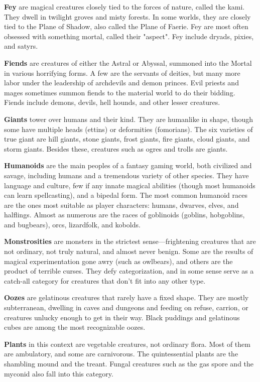 \textbf*{Fey} are magical creatures closely tied to the forces of nature, called the kami. They dwell in twilight groves and misty forests. In some worlds, they are closely tied to the Plane of Shadow, also called the Plane of Faerie. Fey are most often obsessed with something mortal, called their "aspect". Fey include dryads, pixies, and satyrs.

\textbf*{Fiends} are creatures of either the Astral or Abyssal, summoned into the Mortal in various horrifying forms. A few are the servants of deities, but many more labor under the leadership of archdevils and demon princes. Evil priests and mages sometimes summon fiends to the material world to do their bidding. Fiends include demons, devils, hell hounds, and other lesser creatures.

\textbf*{Giants} tower over humans and their kind. They are humanlike in shape, though some have multiple heads (ettins) or deformities (fomorians). The six varieties of true giant are hill giants, stone giants, frost giants, fire giants, cloud giants, and storm giants. Besides these, creatures such as ogres and trolls are giants.

\textbf*{Humanoids} are the main peoples of a fantasy gaming world, both civilized and savage, including humans and a tremendous variety of other species. They have language and culture, few if any innate magical abilities (though most humanoids can learn spellcasting), and a bipedal form. The most common humanoid races are the ones most suitable as player characters: humans, dwarves, elves, and halflings. Almost as numerous are the races of goblinoids (goblins, hobgoblins, and bugbears), orcs, lizardfolk, and kobolds.

\textbf*{Monstrosities} are monsters in the strictest sense—frightening creatures that are not ordinary, not truly natural, and almost never benign. Some are the results of magical experimentation gone awry (such as owlbears), and others are the product of terrible curses. They defy categorization, and in some sense serve as a catch-all category for creatures that don't fit into any other type.

\textbf*{Oozes} are gelatinous creatures that rarely have a fixed shape. They are mostly subterranean, dwelling in caves and dungeons and feeding on refuse, carrion, or creatures unlucky enough to get in their way. Black puddings and gelatinous cubes are among the most recognizable oozes.

\textbf*{Plants} in this context are vegetable creatures, not ordinary flora. Most of them are ambulatory, and some are carnivorous. The quintessential plants are the shambling mound and the treant. Fungal creatures such as the gas spore and the myconid also fall into this category.

